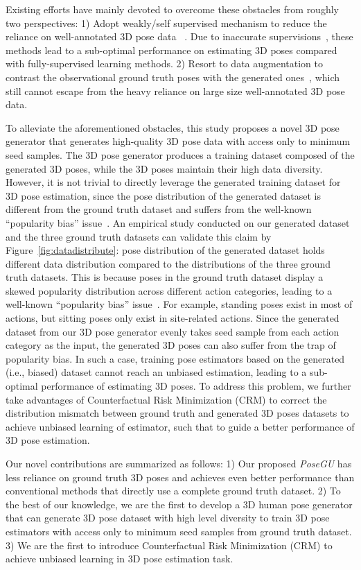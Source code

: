 \documentclass[runningheads]{llncs}
\begin{document}
Existing efforts have mainly devoted to overcome these obstacles from roughly two perspectives: 
1) Adopt weakly/self supervised mechanism to reduce the reliance on well-annotated 3D pose data ~\cite{adver1,adver2,HMR,unsuper1,unsuper2}. Due to inaccurate supervisions~\cite{adver1}, these methods lead to a sub-optimal performance on estimating 3D poses compared with fully-supervised learning methods. 
2) Resort to data augmentation to contrast the observational ground truth poses with the generated ones~\cite{aug1,aug2,aug3,poseaug},
which still cannot escape from the heavy reliance on large size well-annotated 3D pose data. 

To alleviate the aforementioned obstacles, this study proposes a novel 3D pose generator that generates high-quality 3D pose data with access only to minimum seed samples.
The 3D pose generator produces a training dataset composed of the generated 3D poses, while the 3D poses maintain their high data diversity. 
However, it is not trivial to directly leverage the generated training dataset for 3D pose estimation, since the pose distribution of the generated dataset is different from the ground truth dataset and suffers from the well-known ``popularity bias'' issue~\cite{Unbiasedtraining3}. 
An empirical study conducted on our generated dataset and the three ground truth datasets can validate this claim by Figure~\ref{fig:datadistribute}: pose distribution of the generated dataset holds different data distribution compared to the distributions of the three ground truth datasets. 
This is because poses in the ground truth dataset display a skewed popularity distribution across different action categories, leading to a well-known ``popularity bias'' issue~\cite{Unbiasedtraining3}. 
For example, standing poses exist in most of actions, but sitting poses only exist in site-related actions. 
Since the generated dataset from our 3D pose generator evenly takes seed sample from each action category as the input, the generated 3D poses can also suffer from the trap of popularity bias.
In such a case, training pose estimators based on the generated (i.e., biased) dataset cannot reach an unbiased estimation, leading to a sub-optimal performance of estimating 3D poses. 
To address this problem, we further take advantages of Counterfactual Risk Minimization (CRM) to correct the distribution mismatch between ground truth and generated 3D poses datasets to achieve unbiased learning of estimator, such that to guide a better performance of 3D pose estimation.

Our novel contributions are summarized as follows: 
1) Our proposed \textit{PoseGU} has less reliance on ground truth 3D poses and achieves even better performance than conventional methods that directly use a complete ground truth dataset. 
2) To the best of our knowledge, we are the first to develop a 3D human pose generator that can generate 3D pose dataset with high level diversity to train 3D pose estimators with access only to minimum seed samples from ground truth dataset. 
3) We are the first to introduce Counterfactual Risk Minimization (CRM) to achieve unbiased learning in 3D pose estimation task.
\end{document}

